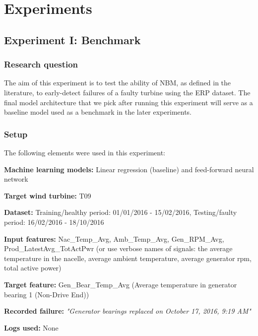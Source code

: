 \chapter{Experiments}
\label{chap:experiments}
\minitoc

\section{Experiment I: Benchmark}
\label{exp:I}

\subsection{Research question}
The aim of this experiment is to test the ability of NBM, as defined in the literature, to early-detect failures of a faulty turbine using the ERP dataset. The final model architecture that we pick after running this experiment will serve as a baseline model used as a benchmark in the later experiments.
\subsection{Setup}
The following elements were used in this experiment:
\begin{bulletList}
 \item \textbf{Machine learning models:} Linear regression (baseline) and feed-forward neural network
 \item \textbf{Target wind turbine:} T09
 \item \textbf{Dataset:} Training/healthy period: 01/01/2016 - 15/02/2016, Testing/faulty period: 16/02/2016 - 18/10/2016
 \item \textbf{Input features:} Nac\_Temp\_Avg, Amb\_Temp\_Avg, Gen\_RPM\_Avg, Prod\_LatestAvg\_TotActPwr (or use verbose names of signals: the average temperature in the nacelle, average ambient temperature, average generator rpm, total active power)
 \item \textbf{Target feature: } Gen\_Bear\_Temp\_Avg (Average temperature in generator bearing 1 (Non-Drive End))
  \item \textbf{Recorded failure:} \textit{"Generator bearings replaced on October 17, 2016, 9:19 AM"}
 \item \textbf{Logs used:} None
\end{bulletList}

